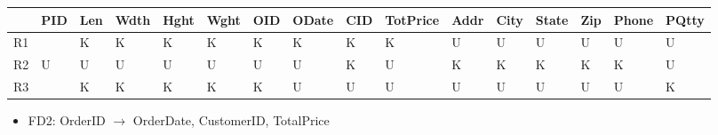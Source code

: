 \documentclass[a4paper]{article}
\begin{document}
\begin{table}[htb]
\begin{tabular}{|l|l|l|l|l|l|l|l|l|l|l|l|l|l|l|l|}
\hline
   & PID                                              & Len                      & Wdth                     & Hght                     & Wght                     & OID & ODate & CID & TotPrice & Addr & City & State & Zip & Phone & PQtty \\ \hline
R1 & \cellcolor[HTML]{FFFC9E}{\color[HTML]{FE0000} K} & K                        & K                        & K                        & K                        & K   & K     & K   & K        & U    & U    & U     & U   & U     & U     \\ \hline
R2 & U                                                & U                        & U                        & U                        & U                        & U   & U     & K   & U        & K    & K    & K     & K   & K     & U     \\ \hline
R3 & \cellcolor[HTML]{FFFC9E}{\color[HTML]{FE0000} K} & {\color[HTML]{FE0000} K} & {\color[HTML]{FE0000} K} & {\color[HTML]{FE0000} K} & {\color[HTML]{FE0000} K} & K   & U     & U   & U        & U    & U    & U     & U   & U     & K     \\ \hline
\end{tabular}
\end{table}

\begin{itemize}
    \item FD2: OrderID $\rightarrow$ OrderDate, CustomerID, TotalPrice
\end{itemize}
\end{document}
